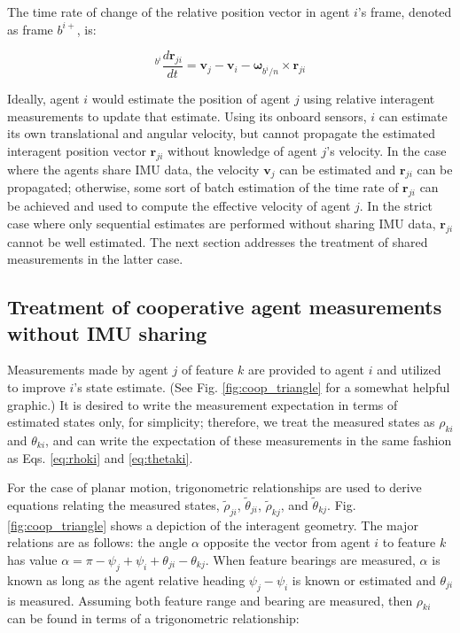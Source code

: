 \documentclass{aiaa-tc}
\newcommand{\B}[1]{\textbf{#1}} %
\newcommand{\BG}[1]{{\bm #1}}           %
\newcommand{\ddarg}[2]{\frac{d#1}{d#2}} %
\begin{document}
The time rate of change of the relative position vector in agent $i$'s frame, denoted as frame $b^{i+}$, is:

\begin{equation}
{}^{b^i} \ddarg{\B{r}_{ji}}{t} = \B{v}_j-\B{v}_i-\BG{\omega}_{b^i/n} \times \B{r}_{ji}
\end{equation}

Ideally, agent $i$ would estimate the position of agent $j$ using relative interagent measurements to update that estimate. Using its onboard sensors, $i$ can estimate its own translational and angular velocity, but cannot propagate the estimated interagent position vector $\B{r}_{ji}$ without knowledge of agent $j$'s velocity. In the case where the agents share IMU data, the velocity $\B{v}_j$ can be estimated and $\B{r}_{ji}$ can be propagated; otherwise, some sort of batch estimation of the time rate of $\B{r}_{ji}$ can be achieved and used to compute the effective velocity of agent $j$. In the strict case where only sequential estimates are performed without sharing IMU data, $\B{r}_{ji}$ cannot be well estimated. The next section addresses the treatment of shared measurements in the latter case.

\subsection{Treatment of cooperative agent measurements without IMU sharing}

Measurements made by agent $j$ of feature $k$ are provided to agent $i$ and utilized to improve $i$'s state estimate. (See Fig. \ref{fig:coop_triangle} for a somewhat helpful graphic.) It is desired to write the measurement expectation in terms of estimated states only, for simplicity; therefore, we treat the measured states as $\rho_{ki}$ and $\theta_{ki}$, and can write the expectation of these measurements in the same fashion as Eqs. \ref{eq:rhoki} and \ref{eq:thetaki}.

For the case of planar motion, trigonometric relationships are used to derive equations relating the measured states, $\tilde{\rho}_{ji}$, $\tilde{\theta}_{ji}$, $\tilde{\rho}_{kj}$, and $\tilde{\theta}_{kj}$. Fig. \ref{fig:coop_triangle} shows a depiction of the interagent geometry. The major relations are as follows: the angle $\alpha$ opposite the vector from agent $i$ to feature $k$ has value $\alpha = \pi - \psi_j +\psi_i+\theta_{ji}-\theta_{kj}$. When feature bearings are measured, $\alpha$ is known as long as the agent relative heading $\psi_j-\psi_i$ is known or estimated and $\theta_{ji}$ is measured. Assuming both feature range and bearing are measured, then $\rho_{ki}$ can be found in terms of a trigonometric relationship:
\end{document}
